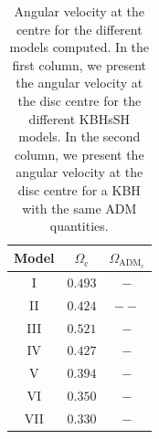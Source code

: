 \documentclass[twocolumn,aps,showpacs,showkeys,prd,superscriptaddress,byrevtex, amsmath]{revtex4-1}
\begin{document}
\begin{table}
\caption{Angular velocity at the centre for the different models computed. In the first column, we present the angular velocity at the disc centre for the different KBHsSH models. In the second column, we present the angular velocity at the disc centre for a KBH with the same ADM quantities.}
\label{angular_velocity_table}      
\centering          
\begin{tabular}{c c c }
\hline\hline       
 Model & $\Omega_{\mathrm{c}}$ & $\Omega_{\mathrm{ADM_c}}$ \\ 
\hline           
I & $0.493$ & $-$ \\ 
 \hline 
II & $0.424$ & $--$ \\
 \hline 
III & $0.521$ & $-$ \\ 
 \hline 
IV & $0.427$ & $-$ \\ 
 \hline 
V & $0.394$ & $-$ \\ 
 \hline 
VI & $0.350$ & $-$ \\ 
 \hline 
VII & $0.330$ & $-$ \\ 
\hline      
\end{tabular}
\end{table}
\end{document}
